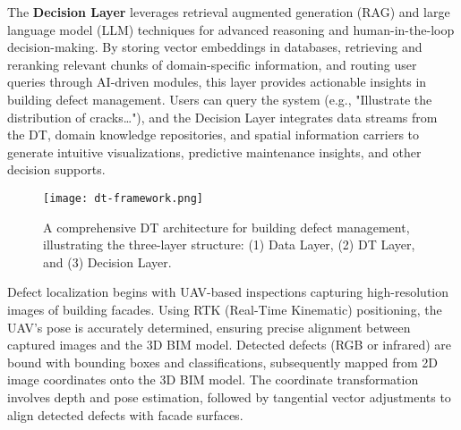 \documentclass[a4paper,fleqn]{cas-sc}
\begin{document}
The \textbf{Decision Layer} leverages retrieval augmented generation (RAG) and large language model (LLM) techniques for advanced reasoning and human-in-the-loop decision-making. By storing vector embeddings in databases, retrieving and reranking relevant chunks of domain-specific information, and routing user queries through AI-driven modules, this layer provides actionable insights in building defect management. Users can query the system (e.g., "Illustrate the distribution of cracks…"), and the Decision Layer integrates data streams from the DT, domain knowledge repositories, and spatial information carriers to generate intuitive visualizations, predictive maintenance insights, and other decision supports.

\begin{figure*}[t!]
    \centering
    \texttt{[image: dt-framework.png]}
    \caption{A comprehensive DT architecture for building defect management, illustrating the three-layer structure: (1) Data Layer, (2) DT Layer, and (3) Decision Layer.}
    \label{fig:dt-framework}
\end{figure*}

Defect localization begins with UAV-based inspections capturing high-resolution images of building facades. Using RTK (Real-Time Kinematic) positioning, the UAV's pose is accurately determined, ensuring precise alignment between captured images and the 3D BIM model. Detected defects (RGB or infrared) are bound with bounding boxes and classifications, subsequently mapped from 2D image coordinates onto the 3D BIM model. The coordinate transformation involves depth and pose estimation, followed by tangential vector adjustments to align detected defects with facade surfaces.
\end{document}
